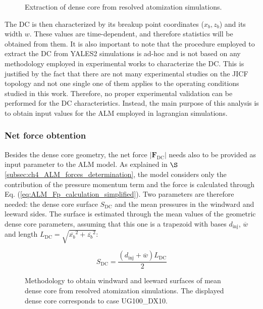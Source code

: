 \begin{figure}[ht]
     \centering
     \caption{Extraction of dense core from resolved atomization simulations.}
      \label{fig:dense_core_extraction}
\end{figure}

The DC is then characterized by its breakup point coordinates ($x_b, z_b$) and its width $w$. These values are time-dependent, and therefore statistics will be obtained from them. It is also important to note that the procedure employed to extract the DC from YALES2 simulations is ad-hoc and is not based on any methodology employed in experimental works to characterize the DC. This is justified by the fact that there are not many experimental studies on the JICF topology and not one single one of them applies to the operating conditions studied in this work. Therefore, no proper experimental validation can be performed for the DC characteristics. Instead, the main purpose of this analysis is to obtain input values for the ALM employed in lagrangian simulations.

\subsubsection*{Net force obtention}


Besides the dense core geometry, the net force $|\textbf{F}_\mathrm{DC}|$ needs also to be provided as input parameter to the ALM model. As explained in $\S$\ref{subsec:ch4_ALM_forces_determination}, the model considers only the contribution of the pressure momentum term and the force is calculated through Eq. (\ref{eq:ALM_Fp_calculation_simplified}). Two parameters are therefore needed: the dense core surface $S_\mathrm{DC}$ and the mean pressures in the windward and leeward sides. The surface is estimated through the mean values of the geometric dense core parameters, assuming that this one is a trapezoid with bases $d_\mathrm{inj}$, $\overline{w}$ and length $L_\mathrm{DC} = \sqrt{\overline{x_b}^2 + \overline{z_b}^2}$:

\begin{equation}
S_\mathrm{DC} = \frac{\left( d_\mathrm{inj} + \overline{w} \right) L_\mathrm{DC} }{2} 
\end{equation}

\begin{figure}[ht]
\centering
{}
\caption[Methodology to obtain windward and leeward surfaces of mean dense core from resolved atomization simulations]{Methodology to obtain windward and leeward surfaces of mean dense core from resolved atomization simulations. The displayed dense core corresponds to case UG100\_DX10.}
\label{fig:extraction_methodology_mean_DC}
\end{figure}

